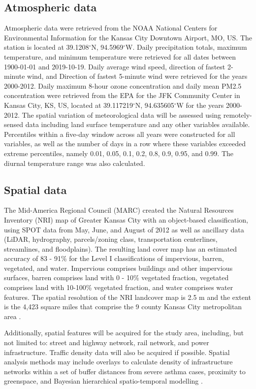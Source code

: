  \subsection{Atmospheric data}

 Atmospheric data were retrieved from the NOAA National Centers for Environmental Information for the Kansas City Downtown Airport, MO, US.
 The station is located at 39.1208$^{\circ}$N, 94.5969$^{\circ}$W. Daily precipitation totals, maximum temperature, and minimum temperature were retrieved for all dates between 1900-01-01 and 2019-10-19.
 Daily average wind speed, direction of fastest 2-minute wind, and Direction of fastest 5-minute wind were retrieved for the years 2000-2012.
 Daily maximum 8-hour ozone concentration and daily mean PM2.5 concentration were retrieved from the EPA for the JFK Community Center in Kansas City, KS, US, located at 39.117219$^{\circ}$N, 94.635605$^{\circ}$W for the years 2000-2012.
 The spatial variation of meteorological data will be assessed using remotely-sensed data including land surface temperature and any other variables available.
 Percentiles within a five-day window across all years were constructed for all variables, as well as the number of days in a row where these variables exceeded extreme percentiles, namely 0.01, 0.05, 0.1, 0.2, 0.8, 0.9, 0.95, and 0.99.
 The diurnal temperature range was also calculated.

 \subsection{Spatial data}

 The Mid-America Regional Council (MARC) created the Natural Resources Inventory (NRI) map of Greater Kansas City with an object-based classification, using SPOT data from May, June, and August of 2012 as well as ancillary data (LiDAR, hydrography, parcels/zoning class, transportation centerlines, streamlines, and floodplains).
 The resulting land cover map has an estimated accuracy of 83 - 91\% for the Level I classifications of impervious, barren, vegetated, and water.
 Impervious comprises buildings and other impervious surfaces, barren comprises land with 0 - 10\% vegetated fraction, vegetated comprises land with 10-100\% vegetated fraction, and water comprises water features.
 The spatial resolution of the NRI landcover map is 2.5 m and the extent is the 4,423 square miles that comprise the 9 county Kansas City metropolitan area \citep{Mid-2013}.

 Additionally, spatial features will be acquired for the study area, including, but not limited to: street and highway network, rail network, and power infrastructure.
 Traffic density data will also be acquired if possible.
 Spatial analysis methods may include overlays to calculate density of infrastructure networks within a set of buffer distances from severe asthma cases, proximity to greenspace, and Bayesian hierarchical spatio-temporal modelling \citep{Khana2018}.
